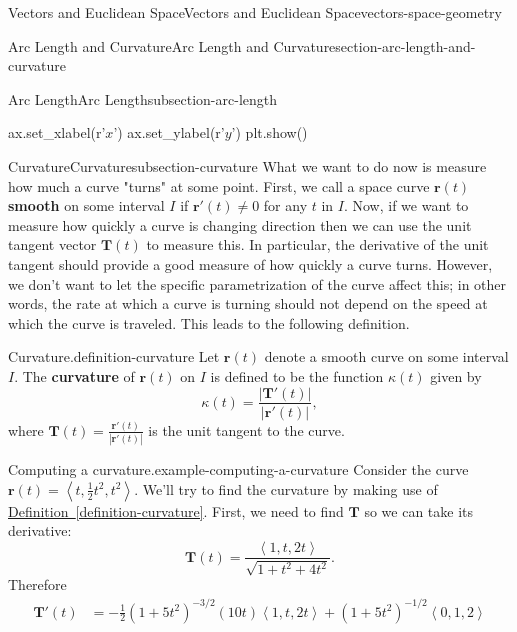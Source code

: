 \documentclass[oneside,10pt,]{book}
\newcommand{\terminology}[1]{\textbf{#1}}
\numberwithin{equation}{section}
\newcommand{\vv}[1]{\mathbf{#1}}
\newcommand{\dotprod}[1]{\left\langle #1 \right\rangle}
\begin{document}
\begin{chapterptx}{Vectors and Euclidean Space}{}{Vectors and Euclidean Space}{}{}{vectors-space-geometry}
\begin{sectionptx}{Arc Length and Curvature}{}{Arc Length and Curvature}{}{}{section-arc-length-and-curvature}
\begin{subsectionptx}{Arc Length}{}{Arc Length}{}{}{subsection-arc-length}
\begin{sageinput}
ax.set_xlabel(r'$x$')
ax.set_ylabel(r'$y$')
plt.show()
\end{sageinput}
\end{subsectionptx}
%
%
\typeout{************************************************}
\typeout{************************************************}
%
\begin{subsectionptx}{Curvature}{}{Curvature}{}{}{subsection-curvature}
\hypertarget{p-1285}{}%
What we want to do now is measure how much a curve "turns" at some point. First, we call a space curve \(\vv{r}(t)\) \terminology{smooth} on some interval \(I\) if \(\vv{r}'(t)\neq0\) for any \(t\) in \(I\). Now, if we want to measure how quickly a curve is changing direction then we can use the unit tangent vector \(\vv{T}(t)\) to measure this. In particular, the derivative of the unit tangent should provide a good measure of how quickly a curve turns. However, we don't want to let the specific parametrization of the curve affect this; in other words, the rate at which a curve is turning should not depend on the speed at which the curve is traveled. This leads to the following definition.%
\begin{definition}{Curvature.}{definition-curvature}%
\hypertarget{p-1286}{}%
Let \(\vv{r}(t)\) denote a smooth curve on some interval \(I\). The \terminology{curvature} of \(\vv{r}(t)\) on \(I\) is defined to be the function \(\kappa(t)\) given by%
%
\begin{equation*}
\kappa(t) = \frac{|\vv{T}'(t)|}{|\vv{r}'(t)|},
\end{equation*}
\hypertarget{p-1287}{}%
where \(\vv{T}(t) = \frac{\vv{r}'(t)}{|\vv{r}'(t)|}\) is the unit tangent to the curve.%
\end{definition}
\begin{example}{Computing a curvature.}{example-computing-a-curvature}%
\hypertarget{p-1288}{}%
Consider the curve \(\vv{r}(t) = \dotprod{t,\frac{1}{2}t^{2},t^{2}}.\) We'll try to find the curvature by making use of \hyperref[definition-curvature]{Definition~\ref{definition-curvature}}. First, we need to find \(\vv{T}\) so we can take its derivative:%
%
\begin{equation*}
\vv{T}(t) = \frac{\dotprod{1,t,2t}}{\sqrt{1+t^{2}+4t^{2}}}.
\end{equation*}
\hypertarget{p-1289}{}%
Therefore%
%
\begin{align*}
\vv{T}'(t) & = -\frac{1}{2}(1+5t^{2})^{-3/2}(10t)\dotprod{1,t,2t} + (1+5t^{2})^{-1/2}\dotprod{0,1,2} \\

\end{align*}
\end{example}
\end{subsectionptx}
\end{sectionptx}
\end{chapterptx}
\end{document}
